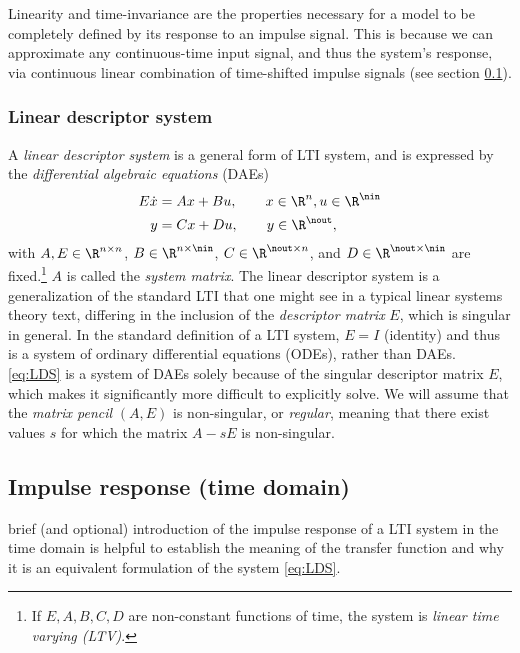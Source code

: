 Linearity and time-invariance are the properties necessary for a model to be completely defined by its response to an impulse signal.  This is because we can approximate any continuous-time input signal, and thus the system's response,  via  continuous linear combination of time-shifted impulse signals (see section \ref{sec:impulse_response}). 

\subsubsection{Linear descriptor system}  
A \emph{linear descriptor system} is a general form of LTI system, and is expressed by the \emph{differential algebraic equations} (DAEs) 
 \begin{equation}
\begin{aligned}
E\dot{x} &= Ax +B u, \qquad x\in\R^n, u\in\R^\nin \\
y &= Cx+Du , \qquad y\in\R^\nout,
\end{aligned}
\label{eq:LDS}
\end{equation}
with $A,E\in\R^{n\times n}$, $B\in\R^{n\times \nin}$, $C\in\R^{\nout\times n}$, and $D\in\R^{\nout\times \nin}$ are fixed.\footnote{If $E,A,B,C,D$ are non-constant functions of time, the system is \emph{linear time varying (LTV)}.}  $A$ is called the \emph{system matrix}.  The linear descriptor system is a generalization of the standard LTI that one might see in a typical linear systems theory text, differing in the inclusion of the \emph {descriptor matrix} $E$, which is singular in general.  In the standard definition of a LTI system,  $E=I$ (identity) and thus is a system of ordinary differential equations (ODEs), rather than DAEs.   
\eqref{eq:LDS} is a system of DAEs solely because of the singular descriptor matrix $E$, which makes it significantly more difficult to  explicitly solve.  We will assume that the \emph{matrix pencil} $(A,E)$ is non-singular,  or \emph{regular}, meaning that there exist values $s$ for which the matrix $A-sE$ is non-singular.
 
\clearpage
\subsection{Impulse response (time domain)}\label{sec:impulse_response}
 brief (and optional) introduction of the impulse response of a LTI system in the time domain is helpful to establish the meaning of the transfer function and why it is an equivalent formulation of the system \eqref{eq:LDS}.   

